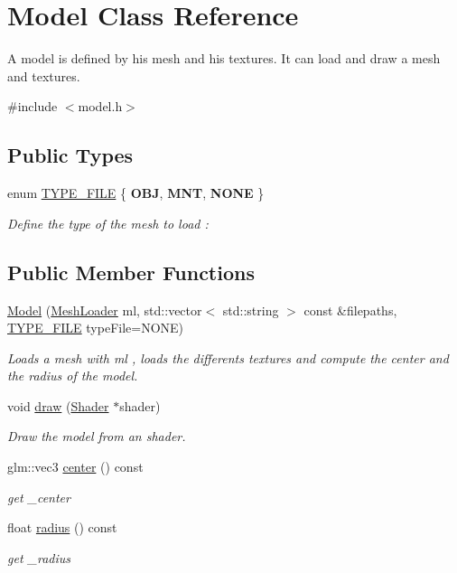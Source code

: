\hypertarget{class_model}{}\section{Model Class Reference}
\label{class_model}


A model is defined by his mesh and his textures. It can load and draw a mesh and textures.  




{\ttfamily \#include $<$model.\+h$>$}

\subsection*{Public Types}
\begin{DoxyCompactItemize}
\item 
enum \mbox{\hyperlink{class_model_afafb51284e4304b85ccb57452e560318}{T\+Y\+P\+E\+\_\+\+F\+I\+LE}} \{ {\bfseries O\+BJ}, 
{\bfseries M\+NT}, 
{\bfseries N\+O\+NE}
 \}
\begin{DoxyCompactList}\small\item\em Define the type of the mesh to load \+: \end{DoxyCompactList}\end{DoxyCompactItemize}
\subsection*{Public Member Functions}
\begin{DoxyCompactItemize}
\item 
\mbox{\hyperlink{class_model_a2ce427936d8b9659f0d269c01481f3bf}{Model}} (\mbox{\hyperlink{class_mesh_loader}{Mesh\+Loader}} ml, std\+::vector$<$ std\+::string $>$ const \&filepaths, \mbox{\hyperlink{class_model_afafb51284e4304b85ccb57452e560318}{T\+Y\+P\+E\+\_\+\+F\+I\+LE}} type\+File=N\+O\+NE)
\begin{DoxyCompactList}\small\item\em Loads a mesh with ml , loads the differents textures and compute the center and the radius of the model. \end{DoxyCompactList}\item 
void \mbox{\hyperlink{class_model_ae83ef40bd304017057327b0352127041}{draw}} (\mbox{\hyperlink{class_shader}{Shader}} $\ast$shader)
\begin{DoxyCompactList}\small\item\em Draw the model from an shader. \end{DoxyCompactList}\item 
glm\+::vec3 \mbox{\hyperlink{class_model_aa3621b0f2a645bdb3aec762b401b1871}{center}} () const
\begin{DoxyCompactList}\small\item\em get \+\_\+center \end{DoxyCompactList}\item 
float \mbox{\hyperlink{class_model_afffc3ad861607c174b32a5f0b7ca9a65}{radius}} () const
\begin{DoxyCompactList}\small\item\em get \+\_\+radius \end{DoxyCompactList}\end{DoxyCompactItemize}


